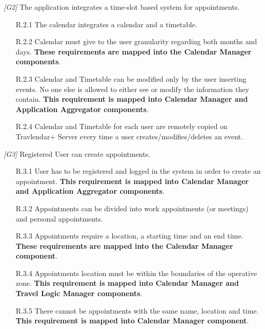 \begin{description}
	\item \textit{[G2]} The application integrates a time-slot based system for appointments.
		\begin{itemize}
			\item [R.2.1] The calendar integrates a calendar and a timetable.
			
			\item [R.2.2] Calendar must give to the user granularity regarding both months and days.
			\textbf{These requirements are mapped into the Calendar Manager components}.

			\item [R.2.3] Calendar and Timetable can be modified only by the user inserting events. No one else is allowed to either see or modify the information they contain.			
			\textbf{This requirement is mapped into Calendar Manager and Application Aggregator components}.
			
			\item [R.2.4] Calendar and Timetable for each user are remotely copied on Travlendar+ Server every time a user creates/modifies/deletes an event.
		\end{itemize}


	\item \textit{[G3]} Registered User can create appointments.
		\begin{itemize}
			\item [R.3.1] User has to be registered and logged in the system in order to create an appointment.
			\textbf{This requirement is mapped into Calendar Manager and Application Aggregator components}.

			\item [R.3.2] Appointments can be divided into work appointments (or meetings) and personal appointments.

			\item [R.3.3] Appointments require a location, a starting time and an end time.
			\textbf{These requirements are mapped into the Calendar Manager component}.

			\item [R.3.4] Appointments location must be within the boundaries of the operative zone.
			\textbf{This requirement is mapped into Calendar Manager and Travel Logic Manager components}.

			\item [R.3.5] There cannot be appointments with the same name, location and time.
			\textbf{This requirement is mapped into Calendar Manager component}.


\end{itemize}
\end{description}
